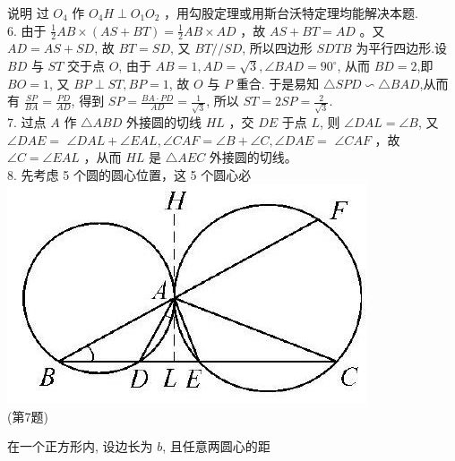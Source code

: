 \documentclass[10pt]{article}
\begin{document}
说明 过 $O_{4}$ 作 $O_{4} H \perp O_{1} O_{2}$ ，用勾股定理或用斯台沃特定理均能解决本题.\\
6. 由于 $\frac{1}{2} A B \times(A S+B T)=\frac{1}{2} A B \times A D$ ，故 $A S+B T=A D$ 。又 $A D=A S+S D$, 故 $B T=S D$, 又 $B T / / S D$, 所以四边形 $S D T B$ 为平行四边形.设 $B D$ 与 $S T$ 交于点 $O$, 由于 $A B=1, A D=\sqrt{3}, \angle B A D=90^{\circ}$, 从而 $B D=2$,即 $B O=1$, 又 $B P \perp S T, B P=1$, 故 $O$ 与 $P$ 重合. 于是易知 $\triangle S P D \backsim \triangle B A D$,从而有 $\frac{S P}{B A}=\frac{P D}{A D}$, 得到 $S P=\frac{B A \cdot P D}{A D}=\frac{1}{\sqrt{3}}$, 所以 $S T=2 S P=\frac{2}{\sqrt{3}}$.\\
7. 过点 $A$ 作 $\triangle A B D$ 外接圆的切线 $H L$ ，交 $D E$ 于点 $L$, 则 $\angle D A L=\angle B$, 又 $\angle D A E=$ $\angle D A L+\angle E A L, \angle C A F=\angle B+\angle C, \angle D A E=$ $\angle C A F$ ，故 $\angle C=\angle E A L$ ，从而 $H L$ 是 $\triangle A E C$ 外接圆的切线。\\
8. 先考虑 5 个圆的圆心位置，这 5 个圆心必\\
\includegraphics[max width=\textwidth, center]{2024_10_30_66b8e5e701da2093c133g-092}\\
(第7题)

在一个正方形内, 设边长为 $b$, 且任意两圆心的距
\end{document}
